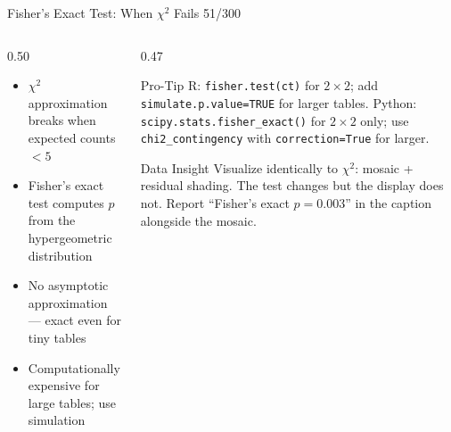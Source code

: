 \documentclass[10pt]{beamer}
\newcommand{\smark}[1]{\hfill{\scriptsize\color{codegray}#1}}
\begin{document}
\begin{frame}{Fisher's Exact Test: When $\chi^2$ Fails}
\smark{51/300}
\begin{columns}[T]
\begin{column}{0.50\textwidth}
\begin{itemize}
    \item $\chi^2$ approximation breaks when expected counts $< 5$
    \item Fisher's exact test computes $p$ from the hypergeometric distribution
    \item No asymptotic approximation --- exact even for tiny tables
    \item Computationally expensive for large tables; use simulation
\end{itemize}
\end{column}
\begin{column}{0.47\textwidth}
\begin{alertblock}{Pro-Tip}
    \scriptsize R: \texttt{fisher.test(ct)} for $2 \times 2$; add \texttt{simulate.p.value=TRUE} for larger tables. Python: \texttt{scipy.stats.fisher\_exact()} for $2 \times 2$ only; use \texttt{chi2\_contingency} with \texttt{correction=True} for larger.
\end{alertblock}
\vspace{0.1cm}
\begin{exampleblock}{Data Insight}
    \scriptsize Visualize identically to $\chi^2$: mosaic + residual shading. The test changes but the display does not. Report ``Fisher's exact $p = 0.003$'' in the caption alongside the mosaic.
\end{exampleblock}
\end{column}
\end{columns}
\end{frame}
\end{document}
